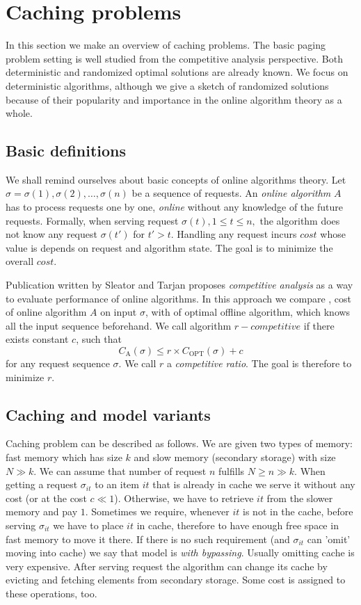 \section{Caching problems}
In this section we make an overview of caching problems. The basic paging 
problem setting is well studied from the competitive analysis perspective. 
Both deterministic and randomized optimal solutions are already known. We focus 
on deterministic algorithms, although we give a sketch of randomized solutions 
because of their popularity and importance in the online algorithm theory as a 
whole. 
\subsection{Basic definitions}
We shall remind ourselves about basic concepts of online algorithms theory. 
Let $\sigma = \sigma(1), \sigma(2), \ldots, \sigma(n)$ be a sequence of 
requests. An \textit{online algorithm} $A$ has to process requests one by one, 
\textit{online} without any knowledge of the future requests. Formally, when 
serving request 
$\sigma(t), 1 \leq t \leq n,$ the algorithm does not know any request 
$\sigma(t')$ for $t'>t$. Handling any request incurs $cost$ whose value is 
depends on request and algorithm state. The goal is to minimize the overall 
$cost$.

Publication written by Sleator and Tarjan proposes 
\textit{competitive analysis} as a way to evaluate performance of online 
algorithms. In this approach we compare , cost of online algorithm 
$A$ on input $\sigma$, with  of optimal offline algorithm, 
which knows all the input sequence beforehand. We call algorithm $r-competitive$ 
if there exists constant $c$, such that
$$C_{\mathrm{A}}(\sigma) \leq r \times C_{\mathrm{OPT}}(\sigma) + c$$
for any request sequence $\sigma$. We call $r$ a \textit{competitive ratio}. 
The goal is therefore to minimize $r$.

\subsection{Caching and model variants}
Caching problem can be described as follows. We are given two types of memory: 
fast memory which has size $k$ and slow memory (secondary storage) with size $N 
\gg k$. We can 
assume that number of request $n$ fulfills $N \geq n \gg k$. When getting a 
request $\sigma_{it}$ to an item $it$ that is already in cache we serve it 
without any cost (or at the cost $c \ll 1$). 
Otherwise, we have to retrieve $it$ from the slower memory and pay 
$1$. Sometimes we require, whenever $it$ is not in the cache, before 
serving $\sigma_{it}$ we have to place $it$ in cache, therefore to have enough 
free space in fast memory to move it there. If there is no such requirement 
(and $\sigma_{it}$ can 'omit' moving into cache) we say that model is 
\textit{with bypassing}. Usually omitting cache is very expensive. After serving 
request the algorithm can change its cache by evicting and fetching elements 
from secondary storage. Some cost is assigned to these operations, too.

